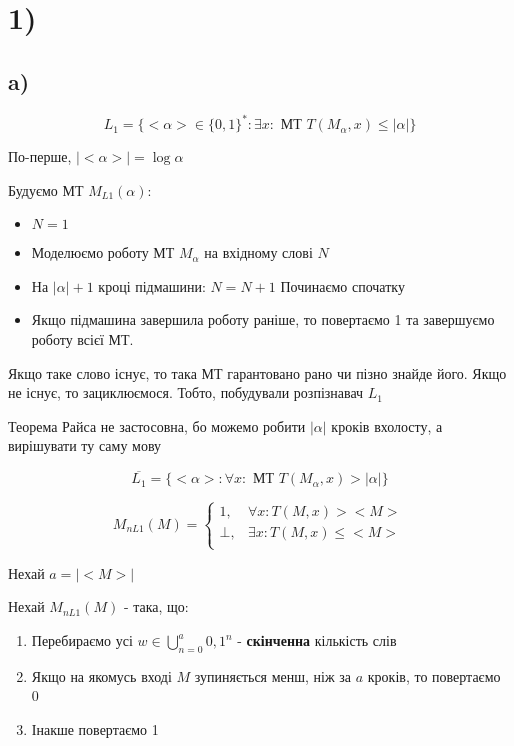\documentclass[11pt, a4paper]{article} %
\begin{document}
\section*{1)}

\subsection*{a)}
\begin{mdframed}
    $$L_1 = \{<\alpha > \in \{0,1\}^* : \exists x: \text{  МТ  } T(M_\alpha,x) \le |\alpha | \}$$
\end{mdframed}

По-перше, $|<\alpha >| = \log \alpha$

Будуємо МТ $M_{L1}(\alpha)$:
\begin{itemize}
    \item $N = 1$
    \item Моделюємо роботу МТ $M_\alpha$ на вхідному слові $N$
    \item На $|\alpha|+1$ кроці підмашини:
    \subitem $N = N+1$ 
    \subitem Починаємо спочатку
    \item Якщо підмашина завершила роботу раніше, то повертаємо 1 та завершуємо роботу всієї МТ.
\end{itemize}
Якщо таке слово існує, то така МТ гарантовано рано чи пізно знайде його. 
Якщо не існує, то зациклюємося. Тобто, побудували розпізнавач $L_1$

Теорема Райса не застосовна, бо можемо робити $|\alpha|$ кроків вхолосту, а вирішувати ту саму мову

$$\overline{L_1} = \{<\alpha> : \forall x: \text{  МТ  } T(M_\alpha,x) > |\alpha |\}$$

$$M_{nL1}(M) = \begin{cases}
    1, & \forall x: T(M, x) > <M>\\
    \bot, & \exists x: T(M, x) \le <M>\\
\end{cases}$$

Нехай $a = |<M>|$

Нехай $M_{nL1}(M)$ - така, що:
\begin{enumerate}
    \item 
    Перебираємо усі $w \in \bigcup_{n=0}^{a} {0,1}^n$ - \textbf{скінченна} кількість слів
    \item
    Якщо на якомусь вході $M$ зупиняється менш, ніж за $a$ кроків, то повертаємо 0
    \item
    Інакше повертаємо 1
\end{enumerate}
\end{document}
